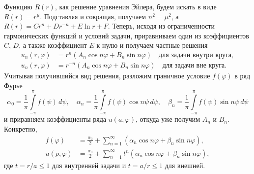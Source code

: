 Функцию $ R(r) $, как решение уравнения Эйлера, будем искать в виде $ R(r) = r^\mu $.
Подставляя и сокращая, получаем $ n^2 = \mu^2 $, а $ R(r) = Cr^n + Dr^{-n} +
E\ln r + F$.
Теперь, исходя из ограниченности гармонических функций и условий задачи, приравниваем один из
коэффициентов $ C $, $ D $, а также коэффициент $ E $ к нулю и получаем частные
решения
\begin{align*}
  u_n(r,\varphi) &= r^n(A_n\cos n\varphi + B_n \sin n\varphi) \quad \text{для
  задачи внутри круга},\\
    u_n(r,\varphi) &= r^{-n}(A_n\cos n\varphi + B_n \sin n\varphi) \quad \text{для
  задачи вне круга}.
\end{align*}
Учитывая получившийся вид решения, разложим граничное условие $ f(\varphi) $ в
ряд Фурье 
\begin{equation}
    \alpha_0 = \frac{1}{\pi}\int\limits_{-\pi}^{\pi}f(\psi)\,d\psi, \quad
    \alpha_n = \frac{1}{\pi}\int\limits_{-\pi}^{\pi}f(\psi)\cos
    n\psi\,d\psi,\quad
    \beta_n = \frac{1}{\pi}\int\limits_{-\pi}^{\pi}f(\psi)\sin n\psi\,d\psi
    \label{eq:fourier_exp}
\end{equation}
и приравняем коэффициенты ряда $ u(a, \varphi) $, откуда уже получим $ A_n $ и $ B_n $.
Конкретно, 
\begin{align}
  f(\varphi) &= \frac{\alpha_0}{2} + \sum_{n=1}^\infty(\alpha_n\cos n\varphi +
  \beta_n \sin n\varphi),\\
  u(\rho, \varphi) &= \frac{\alpha_0}{2} + \sum_{n=1}^\infty t^n (\alpha_n\cos
  n\varphi + \beta_n \sin n\varphi), \label{eq:fourier_sol}
\end{align}
где $ t = r/a \leqslant 1 $ для внутренней задачи и
$ t = a/r \leqslant 1 $ для внешней.




